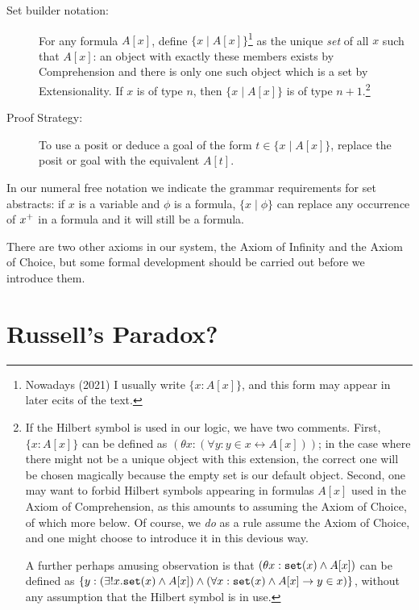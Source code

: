 \documentclass[12pt]{book}
\begin{document}
\begin{description}

\item[Set builder notation:] For any formula $A[x]$, define $\{x \mid
A[x]\}$\footnote{Nowadays (2021) I usually write $\{x :
A[x]\}$, and this form may appear in later ecits of the text.} as the unique {\em set\/} of all $x$ such that $A[x]$: an object with exactly these members exists by
Comprehension and there is only one such object which is a set by Extensionality.  If $x$ is
of type $n$, then $\{x \mid A[x]\}$ is of type $n+1$.\footnote{If the Hilbert symbol is used in our logic, we have two comments.  First, $\{x:A[x]\}$ can
be defined as $(\theta x:(\forall y:y \in x \leftrightarrow A[x]))$; in the case where there might  not be a unique object with this extension, the correct one will be chosen magically because the empty set is our default object.  Second, one may want to forbid Hilbert symbols appearing in formulas $A[x]$ used in the Axiom of Comprehension, as this amounts to assuming the Axiom of Choice, of which more below.  Of course, we {\em do\/} as a rule assume the Axiom of Choice, and one might choose to introduce it in this devious way.

A further perhaps amusing observation is that $(\theta x:{\tt set}(x) \wedge A[x])$ can be defined as $\{y:(\exists!x.{\tt set}(x) \wedge A[x]) \wedge (\forall x:{\tt set}(x) \wedge A[x] \rightarrow y \in x)\}$, without any assumption that the Hilbert symbol is in use.}

\item[Proof Strategy:] To use a posit or deduce a goal of the form $t
\in \{x \mid A[x]\}$, replace the posit or goal with the equivalent
$A[t]$.

\end{description}

In our numeral free notation we indicate the grammar requirements for
set abstracts: if $x$ is a variable and $\phi$ is a formula, $\{x
\mid \phi\}$ can replace any occurrence of $x^{\bf +}$ in a formula and it
will still be a formula.

There are two other axioms in our system, the Axiom of Infinity and
the Axiom of Choice, but some formal development should be carried out
before we introduce them.

\newpage

\section{Russell's Paradox?}
\end{document}
